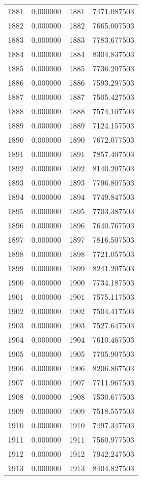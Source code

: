 \documentclass[12pt]{article}
\begin{document}
\begin{longtable}{@{}cccc@{}}
1881 & 0.000000 & 1881 & 7471.087503 \\
1882 & 0.000000 & 1882 & 7665.007503 \\
1883 & 0.000000 & 1883 & 7783.677503 \\
1884 & 0.000000 & 1884 & 8304.837503 \\
1885 & 0.000000 & 1885 & 7736.207503 \\
1886 & 0.000000 & 1886 & 7593.297503 \\
1887 & 0.000000 & 1887 & 7505.427503 \\
1888 & 0.000000 & 1888 & 7574.107503 \\
1889 & 0.000000 & 1889 & 7124.157503 \\
1890 & 0.000000 & 1890 & 7672.077503 \\
1891 & 0.000000 & 1891 & 7857.407503 \\
1892 & 0.000000 & 1892 & 8140.207503 \\
1893 & 0.000000 & 1893 & 7796.807503 \\
1894 & 0.000000 & 1894 & 7749.847503 \\
1895 & 0.000000 & 1895 & 7703.387503 \\
1896 & 0.000000 & 1896 & 7640.767503 \\
1897 & 0.000000 & 1897 & 7816.507503 \\
1898 & 0.000000 & 1898 & 7721.057503 \\
1899 & 0.000000 & 1899 & 8241.207503 \\
1900 & 0.000000 & 1900 & 7734.187503 \\
1901 & 0.000000 & 1901 & 7575.117503 \\
1902 & 0.000000 & 1902 & 7504.417503 \\
1903 & 0.000000 & 1903 & 7527.647503 \\
1904 & 0.000000 & 1904 & 7610.467503 \\
1905 & 0.000000 & 1905 & 7705.907503 \\
1906 & 0.000000 & 1906 & 8206.867503 \\
1907 & 0.000000 & 1907 & 7711.967503 \\
1908 & 0.000000 & 1908 & 7530.677503 \\
1909 & 0.000000 & 1909 & 7518.557503 \\
1910 & 0.000000 & 1910 & 7497.347503 \\
1911 & 0.000000 & 1911 & 7560.977503 \\
1912 & 0.000000 & 1912 & 7942.247503 \\
1913 & 0.000000 & 1913 & 8404.827503 \\

\end{longtable}
\end{document}

